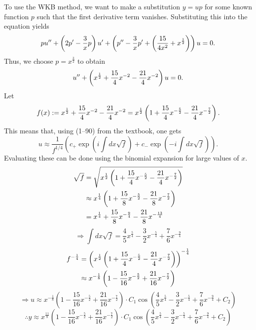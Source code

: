 \item
To use the WKB method, we want to make a substitution $y = up$ for some known function $p$ such that the first derivative term vanishes.
Substituting this into the equation yields
\[
	pu'' + \left( 2p' - \frac{3}{x}p \right)u' + \left( p'' - \frac{3}{x}p' + \left( \frac{15}{4x^2} + x^{\frac{1}{2}} \right) \right)u = 0.
\]	
Thus, we choose $p = x^{\frac{3}{2}}$ to obtain
\[
	u'' + \left( x^{\frac{1}{2}} + \frac{15}{4}x^{-2} - \frac{21}{4}x^{-2} \right) u = 0.
\]
Let
\[
	f(x) := x^{\frac{1}{2}} + \frac{15}{4}x^{-2} - \frac{21}{4}x^{-2} = x^{\frac{1}{2}} \left( 1 + \frac{15}{4}x^{-\frac{5}{2}} - \frac{21}{4}x^{-\frac{7}{2}} \right).
\]
This means that, using  (1--90) from the textbook, one gets
\[
	u \approx \frac{1}{f^{1/4}} \left( c_+ \exp\left( i\int dx \sqrt{f} \right) + c_- \exp\left( -i\int dx \sqrt{f} \right) \right).
\]
Evaluating these can be done using the binomial expansion for large values of $x$.
\begin{align*}
	\sqrt{f}
	&= \sqrt{x^{\frac{1}{2}} \left( 1 + \frac{15}{4}x^{-\frac{5}{2}} - \frac{21}{4}x^{-\frac{7}{2}} \right)} \\
	&\approx x^{\frac{1}{4}} \left( 1 + \frac{15}{8}x^{-\frac{5}{2}} - \frac{21}{8}x^{-\frac{7}{2}} \right) \\
	&= x^{\frac{1}{4}} + \frac{15}{8}x^{-\frac{9}{4}} - \frac{21}{8}x^{-\frac{13}{4}}
\end{align*}
\[
	\Rightarrow \int dx \sqrt{f}
	= \frac{4}{5}x^{\frac{5}{4}} - \frac{3}{2} x^{-\frac{5}{4}} + \frac{7}{6}x^{-\frac{9}{4}}
\]
\begin{align*}
	f^{-\frac{1}{4}}
	&= {\left( x^{\frac{1}{2}} \left( 1 + \frac{15}{4}x^{-\frac{5}{2}} - \frac{21}{4}x^{-\frac{7}{2}} \right) \right)}^{-\frac{1}{4}} \\
	&\approx x^{-\frac{1}{8}} \left( 1 - \frac{15}{16}x^{-\frac{5}{2}} + \frac{21}{16}x^{-\frac{7}{2}} \right)
\end{align*}
\[
	\Rightarrow u
	\approx x^{-\frac{1}{8}} \left( 1 - \frac{15}{16}x^{-\frac{5}{2}} + \frac{21}{16}x^{-\frac{7}{2}} \right)
	\cdot C_1 \cos\left( \frac{4}{5}x^{\frac{5}{4}} - \frac{3}{2} x^{-\frac{5}{4}} + \frac{7}{6}x^{-\frac{9}{4}} + C_2 \right)
\]
\[
	\therefore y
	\approx x^{\frac{11}{8}} \left( 1 - \frac{15}{16}x^{-\frac{5}{2}} + \frac{21}{16}x^{-\frac{7}{2}} \right)
	\cdot C_1 \cos\left( \frac{4}{5}x^{\frac{5}{4}} - \frac{3}{2} x^{-\frac{5}{4}} + \frac{7}{6}x^{-\frac{9}{4}} + C_2 \right)
\]